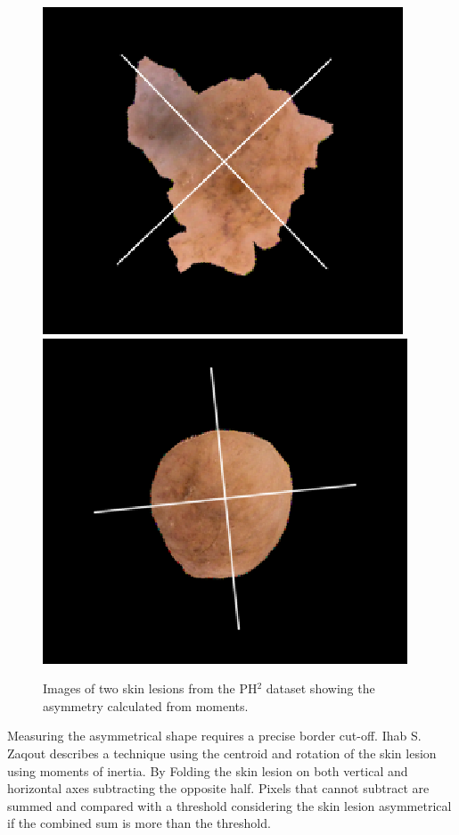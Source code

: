\begin{figure}
	\centering
	\includegraphics[scale=0.5]{images/asym1.png}
	\includegraphics[scale=0.5]{images/asym2.png}
	\caption{Images of two skin lesions from the PH$^2$ dataset showing the asymmetry calculated from moments.}
\end{figure} \label{lit-asym}

Measuring the asymmetrical shape requires a precise border cut-off. Ihab S. Zaqout\cite{Zaqout2016} describes a technique using the centroid and rotation of the skin lesion using moments of inertia. By Folding the skin lesion on both vertical and horizontal axes subtracting the opposite half. Pixels that cannot subtract are summed and compared with a threshold considering the skin lesion asymmetrical if the combined sum is more than the threshold.


